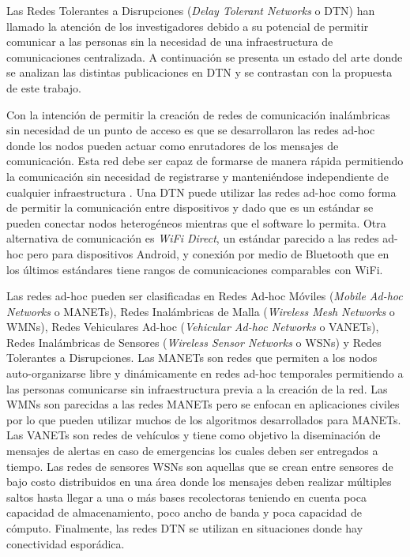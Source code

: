 Las Redes Tolerantes a Disrupciones (\textit{Delay Tolerant Networks} o DTN)
han llamado la atención de los investigadores debido a su potencial de permitir
comunicar a las personas sin la necesidad de una infraestructura de
comunicaciones centralizada. A continuación se presenta un estado del arte donde
se analizan las distintas publicaciones en DTN y se contrastan con la propuesta
de este trabajo.






Con la intención de permitir la creación de redes de comunicación inalámbricas
sin necesidad de un punto de acceso es que se desarrollaron las redes ad-hoc
donde los nodos pueden actuar como enrutadores de los mensajes de comunicación.
Esta red debe ser capaz de formarse de manera rápida permitiendo la comunicación
sin necesidad de registrarse y manteniéndose independiente de cualquier
infraestructura \cite{ad-hoc}. Una DTN puede utilizar las redes ad-hoc como
forma de permitir la comunicación entre dispositivos y dado que es un estándar
se pueden conectar nodos heterogéneos mientras que el software lo permita. Otra
alternativa de comunicación es \textit{WiFi Direct}, un estándar parecido a las
redes ad-hoc pero para dispositivos Android, y conexión por medio de Bluetooth
que en los últimos estándares tiene rangos de comunicaciones comparables con
WiFi.

Las redes ad-hoc pueden ser clasificadas en Redes Ad-hoc Móviles (\textit{Mobile
Ad-hoc Networks} o MANETs), Redes Inalámbricas de Malla (\textit{Wireless Mesh
Networks} o WMNs), Redes Vehiculares Ad-hoc (\textit{Vehicular Ad-hoc Networks}
o VANETs), Redes Inalámbricas de Sensores (\textit{Wireless Sensor Networks} o
WSNs) y Redes Tolerantes a Disrupciones. Las MANETs \cite{MANETs} son redes que
permiten a los nodos auto-organizarse libre y dinámicamente en redes ad-hoc
temporales permitiendo a las personas comunicarse sin infraestructura previa a
la creación de la red.  Las WMNs \cite{WMNs} son parecidas a las redes MANETs
pero se enfocan en aplicaciones civiles por lo que pueden utilizar muchos de los
algoritmos desarrollados para MANETs. Las VANETs \cite{VANETs} son redes de
vehículos y tiene como objetivo la diseminación de mensajes de alertas en caso
de emergencias los cuales deben ser entregados a tiempo. Las redes de sensores
WSNs \cite{WSNs} son aquellas que se crean entre sensores de bajo costo
distribuidos en una área donde los mensajes deben realizar múltiples saltos
hasta llegar a una o más bases recolectoras teniendo en cuenta poca capacidad de
almacenamiento, poco ancho de banda y poca capacidad de cómputo. Finalmente, las
redes DTN se utilizan en situaciones donde hay conectividad esporádica.


